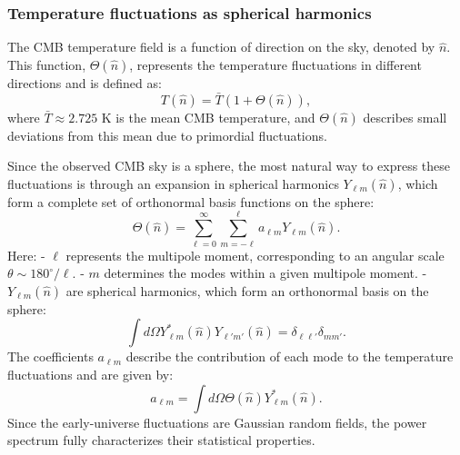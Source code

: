 \documentclass{aa}
\begin{document}



\subsubsection{Temperature fluctuations as spherical harmonics}
\color{Plum}
The CMB temperature field is a function of direction on the sky, denoted by $\hat{n}$. This function, $\Theta(\hat{n})$, represents the temperature fluctuations in different directions and is defined as:  
\begin{equation}
T(\hat{n}) = \bar{T} (1 + \Theta(\hat{n})),
\end{equation}
where $\bar{T} \approx 2.725$ K is the mean CMB temperature, and $\Theta(\hat{n})$ describes small deviations from this mean due to primordial fluctuations.  

Since the observed CMB sky is a sphere, the most natural way to express these fluctuations is through an expansion in spherical harmonics $Y_{\ell m}(\hat{n})$, which form a complete set of orthonormal basis functions on the sphere:
\begin{equation}
\Theta(\hat{n}) = \sum_{\ell=0}^{\infty} \sum_{m=-\ell}^{\ell} a_{\ell m} Y_{\ell m} (\hat{n}).
\end{equation}
Here:  
- $\ell$ represents the multipole moment, corresponding to an angular scale $\theta \sim 180^\circ / \ell$.  
- $m$ determines the modes within a given multipole moment.  
- $Y_{\ell m}(\hat{n})$ are spherical harmonics, which form an orthonormal basis on the sphere:  
  \begin{equation}
  \int d\Omega Y_{\ell m}^*(\hat{n}) Y_{\ell' m'} (\hat{n}) = \delta_{\ell \ell'} \delta_{m m'}.
  \end{equation}
The coefficients $a_{\ell m}$ describe the contribution of each mode to the temperature fluctuations and are given by:
\begin{equation}
a_{\ell m} = \int d\Omega \Theta(\hat{n}) Y_{\ell m}^*(\hat{n}).
\end{equation}
Since the early-universe fluctuations are Gaussian random fields, the power spectrum fully characterizes their statistical properties. 
\end{document}
